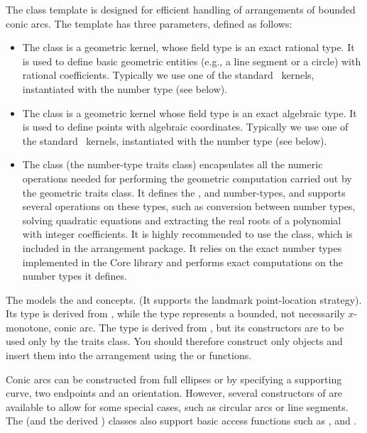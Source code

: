 The  class
template is designed for efficient handling of arrangements of
bounded conic arcs. The template has three parameters, defined as
follows:
\begin{itemize}
\item The  class is a geometric kernel, whose field
type is an exact rational type. It is used to define basic
geometric entities (e.g., a line segment or a circle) with rational
coefficients. Typically we use one of the standard \cgal\ kernels,
instantiated with the number type  (see
below).
%
\item The  class is a geometric kernel whose field
type is an exact algebraic type. It is used to define points with
algebraic coordinates. Typically we use one of the standard
\cgal\ kernels, instantiated with the number type
 (see below).
%
\item The  class (the number-type traits class)
encapsulates all the numeric operations needed for performing the
geometric computation carried out by the geometric traits class.
It defines the ,  and 
number-types, and supports several operations on these types, such
as conversion between number types, solving quadratic equations
and extracting the real roots of a polynomial with integer
coefficients. It is highly recommended to use the
 class, which is included in the
arrangement package. It relies on the exact number types
implemented in the {\sc Core} library and performs exact
computations on the number types it defines.
\end{itemize}

The  models the  and
 concepts. (It supports
the landmark point-location strategy). Its  type is
derived from , while the 
type represents a bounded, not necessarily $x$-monotone, conic arc.
The  type is derived from ,
but its constructors are to be used only by the traits class.
You should therefore construct only  objects and
insert them into the arrangement using the 
or  functions.

Conic arcs can be constructed from full ellipses or by specifying
a supporting curve, two endpoints and an orientation. However,
several constructors of  are available to allow for some
special cases, such as circular arcs or line segments. The
 (and the derived ) classes
also support basic access functions such as ,
 and .

